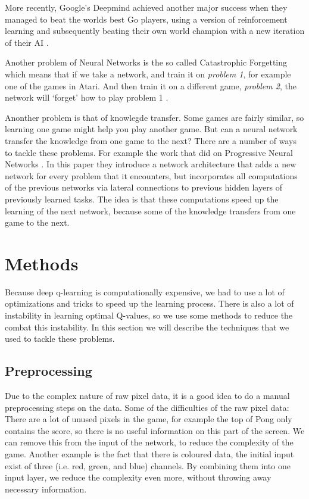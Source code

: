 \documentclass{article}
\begin{document}
More recently, Google's Deepmind achieved another major success when they managed to beat the worlds best Go players, using a version of reinforcement learning and subsequently beating their own world champion with a new iteration of their AI \cite{silver2017mastering}.

Another problem of Neural Networks is the so called Catastrophic Forgetting which means that if we take a network, and train it on \textit{problem 1}, for example one of the games in Atari. And then train it on a different game, \textit{problem 2}, the network will `forget' how to play problem 1 \cite{rusu2016progressive}.

Anonther problem is that of knowlegde transfer. Some games are fairly similar, so learning one game might help you play another game. But can a neural network transfer the knowledge from one game to the next? There are a number of ways to tackle these problems. For example the work that \citeauthor{rusu2016progressive} did on Progressive Neural Networks \cite{rusu2016progressive}. In this paper they introduce a network architecture that adds a new network for every problem that it encounters, but incorporates all computations of the previous networks via lateral connections to previous hidden layers of previously learned tasks. The idea is that these computations speed up the learning of the next network, because some of the knowledge transfers from one game to the next.


\section{Methods}
Because deep q-learning is computationally expensive, we had to use a lot of optimizations and tricks to speed up the learning process. There is also a lot of instability in learning optimal Q-values, so we use some methods to reduce the combat this instability. In this section we will describe the techniques that we used to tackle these problems.

\subsection{Preprocessing}

Due to the complex nature of raw pixel data, it is a good idea to do a manual preprocessing steps on the data. Some of the difficulties of the raw pixel data: There are a lot of unused pixels in the game, for example the top of Pong only contains the score, so there is no useful information on this part of the screen. We can remove this from the input of the network, to reduce the complexity of the game. Another example is the fact that there is coloured data, the initial input exist of three (i.e. red, green, and blue) channels. By combining them into one input layer, we reduce the complexity even more, without throwing away necessary information.
\end{document}
